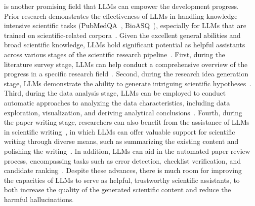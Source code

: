 {{{ is another 
promising field that LLMs can empower the development progress. %
Prior research demonstrates the effectiveness of LLMs in handling knowledge-intensive scientific tasks (\eg PubMedQA~\cite{Jin-emnlp-2019-PubMedQA}, BioASQ~\cite{Anastasia-blog-2022-BioASQ}), especially for LLMs that are trained on scientific-related corpora~\cite{Taylor-arxiv-2022-Galactica,Lewkowycz-arxiv-2022-Solving,Bi-arxiv-2023-OceanGPT}.
Given the excellent general abilities and broad scientific knowledge, LLMs hold significant potential as helpful assistants across various stages of the scientific research pipeline~\cite{Zhang-arxiv-2023-One}. 
First, during the literature survey stage, LLMs can help conduct a comprehensive overview of the  progress in a specific research  field~\cite{Haman-2023-air-Using,Aydn-2022-ssrn-OpenAI}.
Second, during the research idea generation stage, LLMs demonstrate the ability to generate intriguing scientific hypotheses~\cite{Part-2023-arxiv-Can}.
Third, during the data analysis stage, LLMs can be employed to conduct automatic approaches to analyzing the data characteristics,  including data exploration, visualization, and deriving analytical conclusions~\cite{Hasaan-2023-arxiv-ChatGPT,Cheng-2023-arxiv-Is}.
Fourth, during the paper writing stage,  researchers can also benefit from the assistance of LLMs in scientific writing~\cite{Alkaissi-pubmed-2023-Artificial,Azaria-2023-arxiv-ChatGPT}, in which  {LLMs can offer valuable support for scientific writing through diverse means, such as summarizing the existing  content and polishing the writing~\cite{Buruk-2023-arxiv-Academic}. } 
In addition, LLMs can aid in the automated paper review process, encompassing tasks such as error detection, checklist verification, and candidate ranking~\cite{Liu-2023-arxiv-ReviewerGPT}.
Despite these advances, 
there is much room for improving the capacities of LLMs to serve as helpful, trustworthy scientific assistants, to both increase the quality of the generated scientific content  and reduce the harmful hallucinations. 
%


}}}
